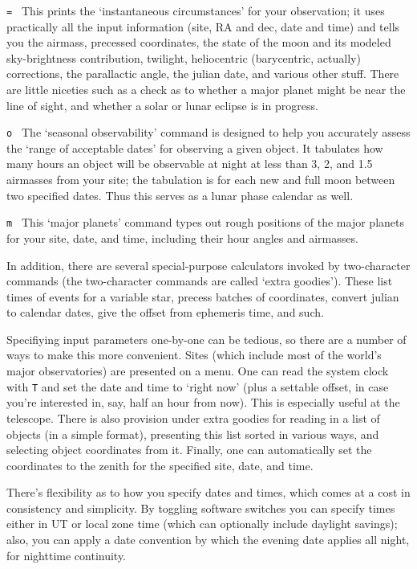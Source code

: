 \item{\tt = } This prints the `instantaneous circumstances' for your
observation; it uses practically all the input information (site, RA and dec,
date and time) and tells you the airmass, precessed coordinates, the state
of the moon and its modeled sky-brightness contribution, twilight,
heliocentric (barycentric, actually) corrections, the parallactic angle,
the julian date, and various other stuff.  There are little niceties
such as a check as to whether a major planet might be near the line of
sight, and whether a solar or lunar eclipse is in progress.

\item{\tt o } The `seasonal observability' command is designed to help
you accurately assess the `range of acceptable dates' for observing a 
given object.  It tabulates how many hours an object will be observable
at night at less than 3, 2, and 1.5 airmasses from your site; the 
tabulation is for each new and full moon between two specified dates.
Thus this serves as a lunar phase calendar as well.

\item{\tt m } This `major planets' command types out rough positions of 
the major planets for your site, date, and time, including their
hour angles and airmasses.  

In addition, there are several special-purpose calculators invoked by
two-character commands 
(the two-character commands are called `extra goodies').  These list
times of events for a variable star, precess batches of coordinates,
convert julian to calendar dates, give the offset from ephemeris
time, and such.

Specifiying input parameters one-by-one can be tedious, so there are a
number of ways to make this more convenient.  Sites (which include
most of the world's major observatories) are presented
on a menu.  One can read the
system clock with {\tt T} and set the date and time to `right now'
(plus a settable offset, in case you're interested in, say,
half an hour from now).  This is especially useful at the telescope.
There is also provision under extra goodies
for reading in a list
of objects (in a simple format), presenting this list sorted in
various ways, and selecting object coordinates from it.  
Finally, one can automatically 
set the coordinates to the zenith for the specified site, date,
and time.

There's flexibility as to how you specify dates and times, which
comes at a cost in consistency and simplicity.  By toggling
software switches you can specify times either in UT or local zone time
(which can optionally include daylight savings); also, you can
apply a date convention by which the evening date applies all night,
for nighttime continuity.
 
